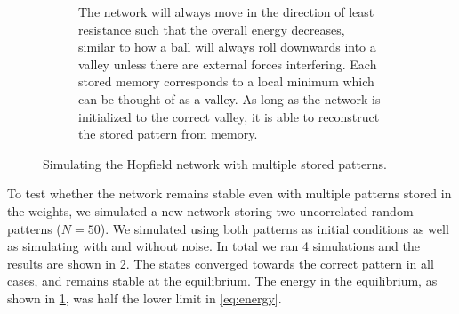 \begin{figure}[H]
\begin{subfigure}{0.49\textwidth}
        \caption{The network will always move in the direction of least resistance such that the overall energy decreases, similar to how a ball will always roll downwards into a valley unless there are external forces interfering. Each stored memory corresponds to a local minimum which can be thought of as a valley. As long as the network is initialized to the correct valley, it is able to reconstruct the stored pattern from memory.}
        \label{fig:multiple-energy}
    \end{subfigure}
    \caption{Simulating the Hopfield network with multiple stored patterns.}
    \label{fig:multiple}
\end{figure}
To test whether the network remains stable even with multiple patterns stored in the weights, we simulated a new network storing two uncorrelated random patterns ($N=50$). We simulated using both patterns as initial conditions as well as simulating with and without noise. In total we ran 4 simulations and the results are shown in \cref{fig:multiple}. The states converged towards the correct pattern in all cases, and remains stable at the equilibrium. The energy in the equilibrium, as shown in \cref{fig:multiple-energy}, was half the lower limit in \cref{eq:energy}.
 

